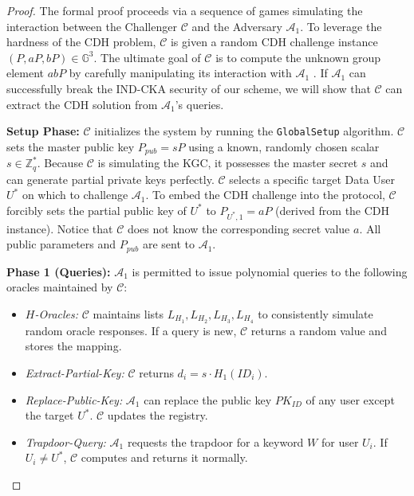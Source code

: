 \documentclass[10pt,journal,compsoc]{IEEEtran}
\begin{document}
\begin{proof}
The formal proof proceeds via a sequence of games simulating the interaction between the Challenger $\mathcal{C}$ and the Adversary $\mathcal{A}_1$. To leverage the hardness of the CDH problem, $\mathcal{C}$ is given a random CDH challenge instance $(P, aP, bP) \in \mathbb{G}^3$. The ultimate goal of $\mathcal{C}$ is to compute the unknown group element $abP$ by carefully manipulating its interaction with $\mathcal{A}_1$ \cite{lu2023certificateless}. If $\mathcal{A}_1$ can successfully break the IND-CKA security of our scheme, we will show that $\mathcal{C}$ can extract the CDH solution from $\mathcal{A}_1$'s queries.

\textbf{Setup Phase:} $\mathcal{C}$ initializes the system by running the \texttt{GlobalSetup} algorithm. $\mathcal{C}$ sets the master public key $P_{pub} = sP$ using a known, randomly chosen scalar $s \in \mathbb{Z}_q^*$. Because $\mathcal{C}$ is simulating the KGC, it possesses the master secret $s$ and can generate partial private keys perfectly. $\mathcal{C}$ selects a specific target Data User $U^*$ on which to challenge $\mathcal{A}_1$. To embed the CDH challenge into the protocol, $\mathcal{C}$ forcibly sets the partial public key of $U^*$ to $P_{U^*,1} = aP$ (derived from the CDH instance). Notice that $\mathcal{C}$ does not know the corresponding secret value $a$. All public parameters and $P_{pub}$ are sent to $\mathcal{A}_1$.

\textbf{Phase 1 (Queries):} $\mathcal{A}_1$ is permitted to issue polynomial queries to the following oracles maintained by $\mathcal{C}$:
\begin{itemize}
    \item \textit{$H$-Oracles:} $\mathcal{C}$ maintains lists $L_{H_1}, L_{H_2}, L_{H_3}, L_{H_4}$ to consistently simulate random oracle responses. If a query is new, $\mathcal{C}$ returns a random value and stores the mapping.
    \item \textit{Extract-Partial-Key:} $\mathcal{C}$ returns $d_i = s \cdot H_1(ID_i)$.
    \item \textit{Replace-Public-Key:} $\mathcal{A}_1$ can replace the public key $PK_{ID}$ of any user except the target $U^*$. $\mathcal{C}$ updates the registry.
    \item \textit{Trapdoor-Query:} $\mathcal{A}_1$ requests the trapdoor for a keyword $W$ for user $U_i$. If $U_i \neq U^*$, $\mathcal{C}$ computes and returns it normally.
\end{itemize}


\end{proof}
\end{document}
